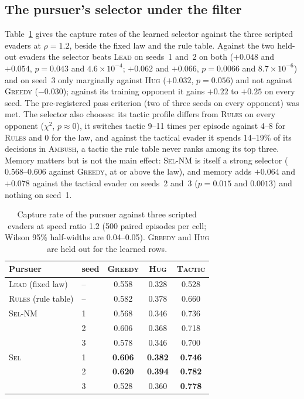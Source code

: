 \documentclass[conference]{IEEEtran}
\newcommand{\pol}[1]{\textsc{#1}}
\begin{document}
\subsection{The pursuer's selector under the filter}
\label{sec:res-baselines}
Table~\ref{tab:fixed} gives the capture rates of the learned selector against the three scripted evaders at $\rho=1.2$, beside the fixed law and the rule table. Against the two held-out evaders the selector beats \pol{Lead} on seeds~1 and~2 on both ($+0.048$ and $+0.054$, $p=0.043$ and $4.6\times10^{-4}$; $+0.062$ and $+0.066$, $p=0.0066$ and $8.7\times10^{-6}$) and on seed~3 only marginally against \pol{Hug} ($+0.032$, $p=0.056$) and not against \pol{Greedy} ($-0.030$); against its training opponent it gains $+0.22$ to $+0.25$ on every seed. The pre-registered pass criterion (two of three seeds on every opponent) was met. The selector also chooses: its tactic profile differs from \pol{Rules} on every opponent ($\chi^2$, $p\approx0$), it switches tactic 9--11 times per episode against 4--8 for \pol{Rules} and 0 for the law, and against the tactical evader it spends 14--19\% of its decisions in \pol{Ambush}, a tactic the rule table never ranks among its top three. Memory matters but is not the main effect: \pol{Sel-NM} is itself a strong selector ($0.568$--$0.606$ against \pol{Greedy}, at or above the law), and memory adds $+0.064$ and $+0.078$ against the tactical evader on seeds~2 and~3 ($p=0.015$ and $0.0013$) and nothing on seed~1.

\begin{table}[t]
\caption{Capture rate of the pursuer against three scripted evaders at speed ratio 1.2 (500 paired episodes per cell; Wilson 95\% half-widths are 0.04--0.05). \pol{Greedy} and \pol{Hug} are held out for the learned rows.}
\label{tab:fixed}
\centering
\small
\begin{tabular}{llccc}
\toprule
Pursuer & seed & \pol{Greedy} & \pol{Hug} & \pol{Tactic} \\
\midrule
\pol{Lead} (fixed law)   & -- & 0.558 & 0.328 & 0.528 \\
\pol{Rules} (rule table) & -- & 0.582 & 0.378 & 0.660 \\
\pol{Sel-NM}             & 1  & 0.568 & 0.346 & 0.736 \\
                         & 2  & 0.606 & 0.368 & 0.718 \\
                         & 3  & 0.578 & 0.346 & 0.700 \\
\pol{Sel}                & 1  & \textbf{0.606} & \textbf{0.382} & \textbf{0.746} \\
                         & 2  & \textbf{0.620} & \textbf{0.394} & \textbf{0.782} \\
                         & 3  & 0.528 & 0.360 & \textbf{0.778} \\
\bottomrule
\end{tabular}
\end{table}
\end{document}
